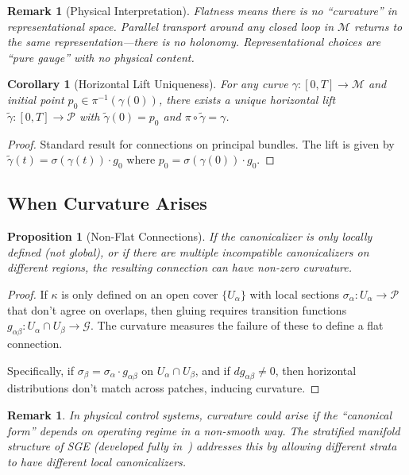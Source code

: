 \documentclass[11pt]{article}
\newtheorem{proposition}[theorem]{Proposition}
\newtheorem{corollary}[theorem]{Corollary}
\newtheorem{remark}[theorem]{Remark}
\begin{document}
\begin{remark}[Physical Interpretation]
Flatness means there is no ``curvature'' in representational space. Parallel transport around any closed loop in $\mathcal{M}$ returns to the same representation---there is no holonomy. Representational choices are ``pure gauge'' with no physical content.
\end{remark}

\begin{corollary}[Horizontal Lift Uniqueness]
For any curve $\gamma : [0, T] \to \mathcal{M}$ and initial point
$p_0 \in \pi^{-1}(\gamma(0))$, there exists a unique horizontal lift $\tilde{\gamma} : [0, T] \to \mathcal{P}$ with $\tilde{\gamma}(0) = p_0$ and $\pi \circ \tilde{\gamma} = \gamma$.
\end{corollary}

\begin{proof}
Standard result for connections on principal bundles. The lift is given by $\tilde{\gamma}(t) = \sigma(\gamma(t)) \cdot g_0$ where $p_0 = \sigma(\gamma(0)) \cdot g_0$.
\end{proof}

\subsection{When Curvature Arises}

\begin{proposition}[Non-Flat Connections]
If the canonicalizer is only locally defined (not
global), or if there are multiple incompatible canonicalizers on different regions, the resulting
connection can have non-zero curvature.
\end{proposition}

\begin{proof}
If $\kappa$ is only defined on an open cover $\{U_\alpha\}$ with local sections $\sigma_\alpha : U_\alpha \to \mathcal{P}$ that don't
agree on overlaps, then gluing requires transition functions $g_{\alpha\beta} : U_\alpha \cap U_\beta \to \mathcal{G}$. The curvature
measures the failure of these to define a flat connection.

Specifically, if $\sigma_\beta = \sigma_\alpha \cdot g_{\alpha\beta}$ on $U_\alpha \cap U_\beta$, and if $dg_{\alpha\beta} \neq 0$, then horizontal distributions don't
match across patches, inducing curvature.
\end{proof}

\begin{remark}
In physical control systems, curvature could arise if the ``canonical form'' depends
on operating regime in a non-smooth way. The stratified manifold structure of SGE (developed fully in~\cite{bond2026ge}) addresses
this by allowing different strata to have different local canonicalizers.
\end{remark}
\end{document}
